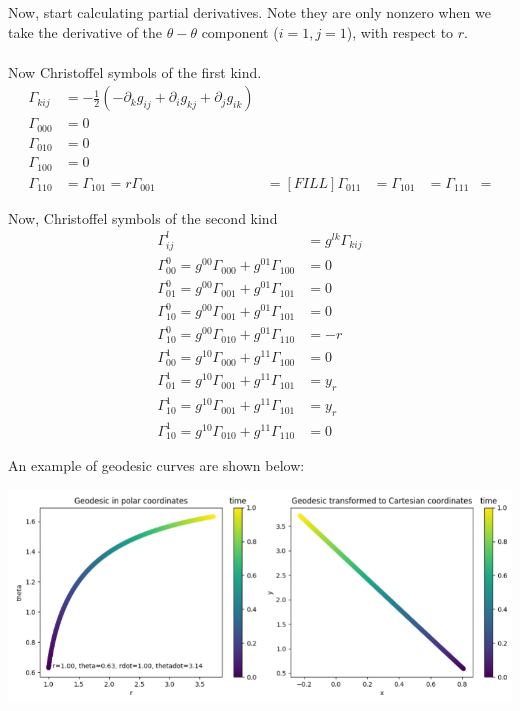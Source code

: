 \documentclass[10pt]{article}
\begin{document}
Now, start calculating partial derivatives.  Note they are only nonzero when we take the derivative of the $\theta - \theta$ component ($i = 1, j = 1$), with respect to $r$.
\begin{align*}
    [FILL]
\end{align*}

Now Christoffel symbols of the first kind.
\begin{align*}
    \Gamma_{kij} &= -\frac{1}{2}(-\partial_k g_{ij} + \partial_i g_{kj} + \partial_j g_{ik})\\
    \Gamma_{000} &= 0\\
    \Gamma_{010} &= 0\\
    \Gamma_{100} &= 0\\
    \Gamma_{110} &= \Gamma_{101} = r
    \Gamma_{001} &= [FILL]
    \Gamma_{011} &= 
    \Gamma_{101} &=
    \Gamma_{111} &=
\end{align*}

Now, Christoffel symbols of the second kind
\begin{align*}
    \Gamma_{ij}^l &= g^{lk} \Gamma_{kij}\\ 
    \Gamma_{00}^0 = g^{00} \Gamma_{000} + g^{01} \Gamma_{100} &= 0 \\ 
    \Gamma_{01}^0 = g^{00} \Gamma_{001} + g^{01} \Gamma_{101} &= 0 \\
    \Gamma_{10}^0 = g^{00} \Gamma_{001} + g^{01} \Gamma_{101} &= 0 \\
    \Gamma_{10}^0 = g^{00} \Gamma_{010} + g^{01} \Gamma_{110} &= -r \\
    \Gamma_{00}^1 = g^{10} \Gamma_{000} + g^{11} \Gamma_{100} &= 0 \\
    \Gamma_{01}^1 = g^{10} \Gamma_{001} + g^{11} \Gamma_{101} &= y_r \\
    \Gamma_{10}^1 = g^{10} \Gamma_{001} + g^{11} \Gamma_{101} &= y_r \\
    \Gamma_{10}^1 = g^{10} \Gamma_{010} + g^{11} \Gamma_{110} &= 0
\end{align*}

An example of geodesic curves are shown below:
\begin{center} 
	\includegraphics*[width=\textwidth]{W9_1.png} 
\end{center}
\end{document}
